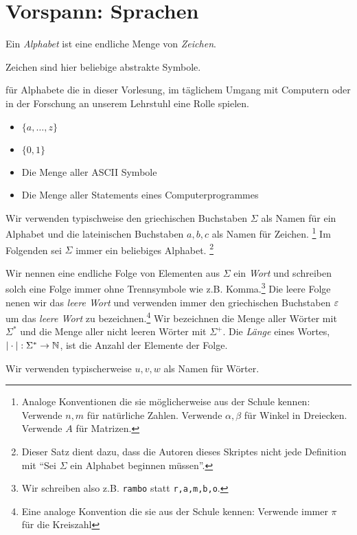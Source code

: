 \section[Vorspann: Sprachen]{Vorspann: Sprachen}
\begin{Def}[name={[Alphabet $\Sigma$]}]
	Ein \emph{Alphabet} ist eine endliche Menge von \emph{Zeichen}.
\end{Def} %
Zeichen sind hier beliebige abstrakte Symbole.

\begin{Bsp*} für Alphabete die in dieser Vorlesung, im täglichem Umgang mit Computern oder in der Forschung an unserem Lehrstuhl eine Rolle spielen.
  \begin{itemize}
  \item $\{a,\dots,z\}$
  \item $\{0, 1\}$
  \item Die Menge aller ASCII Symbole
  \item Die Menge aller Statements eines Computerprogrammes
  \end{itemize}
\end{Bsp*}
Wir verwenden typischweise den griechischen Buchstaben $\Sigma$ als Namen für ein Alphabet und die lateinischen Buchstaben $a,b,c$ als Namen für Zeichen.
\footnote{Analoge Konventionen die sie möglicherweise aus der Schule kennen: Verwende $n,m$ für natürliche Zahlen. Verwende $\alpha, \beta$ für Winkel in Dreiecken. Verwende $A$ für Matrizen.}
Im Folgenden sei $\Sigma$ immer ein beliebiges Alphabet.
\footnote{Dieser Satz dient dazu, dass die Autoren dieses Skriptes nicht jede Definition mit ``Sei $\Sigma$ ein Alphabet beginnen müssen''.}

\begin{Def}[name={[Wort $w$ über $\Sigma$]}]\label{def:1.2}
  Wir nennen eine endliche Folge von Elementen aus $\Sigma$ ein \emph{Wort}
  und schreiben solch eine Folge immer ohne Trennsymbole wie z.B. Komma.\footnote{Wir schreiben also z.B. \texttt{rambo} statt \texttt{r,a,m,b,o}.}
  Die leere Folge nenen wir das \emph{leere Wort} und verwenden immer den griechischen Buchstaben $\varepsilon$ um das \emph{leere Wort} zu bezeichnen.\footnote{Eine analoge Konvention die sie aus der Schule kennen: Verwende immer $\pi$ für die Kreiszahl}
  Wir bezeichnen die Menge aller Wörter mit $\Sigma^*$ und die Menge aller nicht leeren Wörter mit $\Sigma^+$.
  Die \emph{Länge} eines Wortes, $|\cdot| : \Sigma^* \to \mathbb{N}$, ist die Anzahl der Elemente der Folge.
\end{Def}
  Wir verwenden typischerweise $u,v,w$ als Namen für Wörter.

